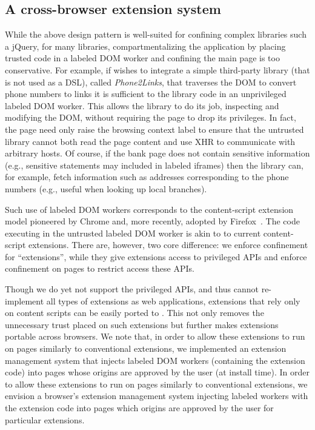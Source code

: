 \subsection{A cross-browser extension system}
\label{sec:system:extension}

While the above design pattern is well-suited for confining complex libraries
such a jQuery, for many libraries, compartmentalizing the application by
placing trusted code in a labeled DOM worker and confining the main page is too
conservative.
%
For example, if  wishes to integrate a simple third-party
library (that is not used as a DSL), called \emph{Phone2Links}, that traverses
the DOM to convert phone numbers to links it is sufficient to the library code
in an unprivileged labeled DOM worker.
%
This allows the library to do its job, inspecting and modifying the DOM,
without requiring the page to drop its privileges.
%
In fact, the page need only raise the browsing context label to ensure that the
untrusted library cannot both read the page content and use XHR to communicate
with arbitrary hosts.
%
Of course, if the bank page does not contain sensitive information (e.g.,
sensitive statements may included in labeled iframes) then the library can, for
example, fetch information such as addresses corresponding to the phone
numbers (e.g., useful when looking up local branches).

Such use of labeled DOM workers corresponds to the content-script extension
model pioneered by Chrome and, more recently, adopted by
Firefox~\cite{Carlini:2012}.
%
The code executing in the untrusted labeled DOM worker is akin to
to current content-script extensions.
%
There are, however, two core difference: we enforce confinement for
``extensions'', while they give extensions access to privileged APIs
and enforce confinement on pages to restrict access these APIs.

Though we do yet not support the privileged APIs, and thus cannot re-implement
all types of extensions as web applications, extensions that rely only on
content scripts can be easily ported to \sys{}.
%
This not only removes the unnecessary trust placed on such extensions but further
makes extensions portable across browsers.
%
We note that, in order to allow these extensions to run on pages
similarly to conventional extensions, we implemented an extension
management system that injects labeled DOM workers (containing the
extension code) into pages whose origins are approved by the user (at
install time).
%
In order to allow these extensions
to run on pages similarly to conventional extensions,
we envision a browser's extension management system
injecting labeled workers with the extension code into pages
which origins are approved by the user
for particular extensions.

